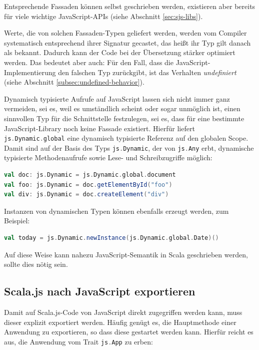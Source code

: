 \documentclass[a4paper, 12pt, hidelinks, listof=totoc, listoftables=totoc, bibliography=totoc]{scrreprt}
\newcommand{\scala}[1]{\lstinline[language=Scala, style=inline]|#1|}
\begin{document}
Entsprechende Fassaden können selbst geschrieben werden, existieren aber bereits für viele wichtige JavaScript-\ac{API}s (siehe Abschnitt \ref{sec:sjs-libs}).

Werte, die von solchen Fassaden-Typen geliefert werden, werden vom Compiler systematisch entsprechend ihrer Signatur gecastet, das heißt ihr Typ gilt danach als bekannt. Dadurch kann der Code bei der Übersetzung stärker optimiert werden. Das bedeutet aber auch: Für den Fall, dass die JavaScript-Implementierung den falschen Typ zurückgibt, ist das Verhalten \emph{undefiniert} (siehe Abschnitt \ref{subsec:undefined-behavior}). \cite[Folie 40, Min. 33]{doeraene2015.SSP}

Dynamisch typisierte Aufrufe auf JavaScript lassen sich nicht immer ganz vermeiden, sei es, weil es umständlich scheint oder sogar unmöglich ist, einen sinnvollen Typ für die Schnittstelle festzulegen, sei es, dass für eine bestimmte JavaScript-Library noch keine Fassade existiert. Hierfür liefert \scala{js.Dynamic.global} eine dynamisch typisierte Referenz auf den globalen Scope. Damit sind auf der Basis des Typs \scala{js.Dynamic}, der von \scala{js.Any} erbt, dynamische typisierte Methodenaufrufe sowie Lese- und Schreibzugriffe möglich:

\begin{lstlisting}[language=Scala, style=snippet]
val doc: js.Dynamic = js.Dynamic.global.document
val foo: js.Dynamic = doc.getElementById("foo")
val div: js.Dynamic = doc.createElement("div")
\end{lstlisting}

Instanzen von dynamischen Typen können ebenfalls erzeugt werden, zum Beispiel:

\begin{lstlisting}[language=Scala, style=snippet]
val today = js.Dynamic.newInstance(js.Dynamic.global.Date)()
\end{lstlisting}

Auf diese Weise kann nahezu JavaScript-Semantik in Scala geschrieben werden, sollte dies nötig sein. \cite{scalajs.DCJ}

\subsection{Scala.js nach JavaScript exportieren}

Damit auf Scala.js-Code von JavaScript direkt zugegriffen werden kann, muss dieser explizit exportiert werden. Häufig genügt es, die Hauptmethode einer Anwendung zu exportieren, so dass diese gestartet werden kann. Hierfür reicht es aus, die Anwendung vom Trait \scala{js.App} zu erben:
\end{document}
